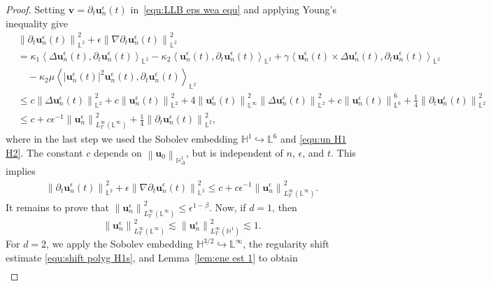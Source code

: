 \documentclass[11pt,reqno]{amsart}
\theoremstyle{definition}
\numberwithin{equation}{section}
\newcommand{\bff}{\boldsymbol}
\newcommand{\bb}{\mathbb}
\newcommand{\leqs}{\lesssim}
\newcommand{\pa}{\partial}
\newcommand{\norm}[2]{\left\|{#1}\right\|_{#2}}
\newcommand{\inpro}[2]{\left\langle#1,#2\right\rangle}
\begin{document}
\begin{proof}
Setting $\bff{v}=\partial_t \bff{u}_n^\epsilon(t)$ in~\eqref{equ:LLB eps wea equ} and applying Young's inequality give
\begin{align*}
	&\norm{\partial_t \bff{u}_n^\epsilon(t)}{\bb{L}^2}^2
	+
	\epsilon \norm{\nabla\partial_t \bff{u}_n^\epsilon (t)}{\bb{L}^2}^2
	\\
	&=
	\kappa_1 \inpro{\Delta \bff{u}_n^\epsilon (t)}{\pa_t \bff{u}_n^\epsilon (t)}_{\bb{L}^2}
	-
	\kappa_2 \inpro{\bff{u}_n^\epsilon (t)}{\pa_t \bff{u}_n^\epsilon (t)}_{\bb{L}^2}
	+
	\gamma
	\inpro{\bff{u}_n^\epsilon(t)\times\Delta\bff{u}_n^\epsilon(t)}{\pa_t \bff{u}_n^\epsilon (t)}_{\bb{L}^2}
	\\
	&\quad
	-
	\kappa_2 \mu
	\inpro{|\bff{u}_n^\epsilon(t)|^2\bff{u}_n^\epsilon(t)}{\pa_t \bff{u}_n^\epsilon (t)}_{\bb{L}^2}
	\\
	&\leq
	c \norm{\Delta \bff{u}_n^\epsilon (t)}{\bb{L}^2}^2
	+
	c \norm{\bff{u}_n^\epsilon (t)}{\bb{L}^2}^2
	+
	4\norm{\bff{u}_n^\epsilon (t)}{\bb{L}^\infty}^2 \norm{\Delta \bff{u}_n^\epsilon (t)}{\bb{L}^2}^2
	+
	c \norm{\bff{u}_n^\epsilon (t)}{\bb{L}^6}^6
	+
	\frac14 \norm{\pa_t \bff{u}_n^\epsilon (t)}{\bb{L}^2}^2
	\\
	&\leq
	c + c\epsilon^{-1} \norm{\bff{u}_n^\epsilon}{L^\infty_T(\bb{L}^\infty)}^2
	+
	\frac14 \norm{\pa_t \bff{u}_n^\epsilon (t)}{\bb{L}^2}^2,
\end{align*}
where in the last step we used the Sobolev embedding $\bb{H}^1\hookrightarrow \bb{L}^6$ and \eqref{equ:un H1 H2}. The constant $c$ depends on $\norm{\bff{u}_0}{\bb{H}^1_\Delta}$, but is independent of $n$, $\epsilon$, and $t$.
This implies 
\begin{align*}
    \norm{\partial_t \bff{u}_n^\epsilon(t)}{\bb{L}^2}^2
	+
	\epsilon \norm{\nabla\partial_t \bff{u}_n^\epsilon (t)}{\bb{L}^2}^2
    \leq
    c + c\epsilon^{-1} \norm{\bff{u}_n^\epsilon}{L^\infty_T(\bb{L}^\infty)}^2.
\end{align*}
It remains to prove that $\norm{\bff{u}_n^\epsilon}{L^\infty_T(\bb{L}^\infty)}^2 \leq \epsilon^{1-\beta}$.
Now, if $d=1$, then 
\begin{equation}\label{equ:Linfty 1}
	\norm{\bff{u}_n^\epsilon}{L^\infty_T(\bb{L}^\infty)}^2
	\leqs
	\norm{\bff{u}_n^\epsilon}{L^\infty_T(\bb{H}^1)}^2
	\leqs 1.
\end{equation}
For $d=2$, we apply the Sobolev embedding $\bb{H}^{3/2}\hookrightarrow \bb{L}^\infty$, the regularity shift estimate \eqref{equ:shift polyg H1s}, and Lemma~\ref{lem:ene est 1} to obtain
\begin{align}\label{equ:Linfty 23}

\end{align}
\end{proof}
\end{document}
